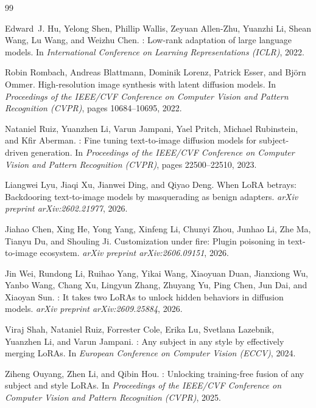 \documentclass[10pt,twocolumn,letterpaper]{article}
\begin{document}
\small
\begin{thebibliography}{99}

Edward~J. Hu, Yelong Shen, Phillip Wallis, Zeyuan Allen-Zhu, Yuanzhi Li, Shean Wang, Lu Wang, and Weizhu Chen.
: Low-rank adaptation of large language models.
\newblock In \emph{International Conference on Learning Representations (ICLR)}, 2022.

Robin Rombach, Andreas Blattmann, Dominik Lorenz, Patrick Esser, and Bj{\"o}rn Ommer.
\newblock High-resolution image synthesis with latent diffusion models.
\newblock In \emph{Proceedings of the IEEE/CVF Conference on Computer Vision and Pattern Recognition (CVPR)}, pages 10684--10695, 2022.

Nataniel Ruiz, Yuanzhen Li, Varun Jampani, Yael Pritch, Michael Rubinstein, and Kfir Aberman.
: Fine tuning text-to-image diffusion models for subject-driven generation.
\newblock In \emph{Proceedings of the IEEE/CVF Conference on Computer Vision and Pattern Recognition (CVPR)}, pages 22500--22510, 2023.

Liangwei Lyu, Jiaqi Xu, Jianwei Ding, and Qiyao Deng.
\newblock When {LoRA} betrays: Backdooring text-to-image models by masquerading as benign adapters.
\newblock \emph{arXiv preprint arXiv:2602.21977}, 2026.

Jiahao Chen, Xing He, Yong Yang, Xinfeng Li, Chunyi Zhou, Junhao Li, Zhe Ma, Tianyu Du, and Shouling Ji.
\newblock Customization under fire: Plugin poisoning in text-to-image ecosystem.
\newblock \emph{arXiv preprint arXiv:2606.09151}, 2026.

Jin Wei, Rundong Li, Ruihao Yang, Yikai Wang, Xiaoyuan Duan, Jianxiong Wu, Yanbo Wang, Chang Xu, Lingyun Zhang, Zhuyang Yu, Ping Chen, Jun Dai, and Xiaoyan Sun.
: It takes two {LoRAs} to unlock hidden behaviors in diffusion models.
\newblock \emph{arXiv preprint arXiv:2609.25884}, 2026.

Viraj Shah, Nataniel Ruiz, Forrester Cole, Erika Lu, Svetlana Lazebnik, Yuanzhen Li, and Varun Jampani.
: Any subject in any style by effectively merging {LoRAs}.
\newblock In \emph{European Conference on Computer Vision (ECCV)}, 2024.

Ziheng Ouyang, Zhen Li, and Qibin Hou.
: Unlocking training-free fusion of any subject and style {LoRAs}.
\newblock In \emph{Proceedings of the IEEE/CVF Conference on Computer Vision and Pattern Recognition (CVPR)}, 2025.


\end{thebibliography}
\end{document}
